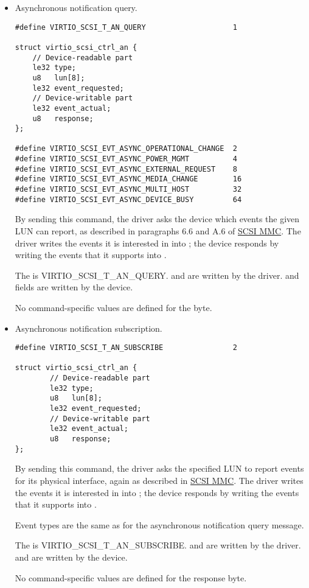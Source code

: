 \begin{itemize}
\item Asynchronous notification query.
\begin{lstlisting}
#define VIRTIO_SCSI_T_AN_QUERY                    1

struct virtio_scsi_ctrl_an {
    // Device-readable part
    le32 type;
    u8   lun[8];
    le32 event_requested;
    // Device-writable part
    le32 event_actual;
    u8   response;
};

#define VIRTIO_SCSI_EVT_ASYNC_OPERATIONAL_CHANGE  2
#define VIRTIO_SCSI_EVT_ASYNC_POWER_MGMT          4
#define VIRTIO_SCSI_EVT_ASYNC_EXTERNAL_REQUEST    8
#define VIRTIO_SCSI_EVT_ASYNC_MEDIA_CHANGE        16
#define VIRTIO_SCSI_EVT_ASYNC_MULTI_HOST          32
#define VIRTIO_SCSI_EVT_ASYNC_DEVICE_BUSY         64
\end{lstlisting}

  By sending this command, the driver asks the device which
  events the given LUN can report, as described in paragraphs 6.6
  and A.6 of \hyperref[intro:SCSI MMC]{SCSI MMC}. The driver writes the
  events it is interested in into ; the device
  responds by writing the events that it supports into
  .

  The  is VIRTIO_SCSI_T_AN_QUERY.  and 
  are written by the driver.  and 
  fields are written by the device.

  No command-specific values are defined for the  byte.

\item Asynchronous notification subscription.
\begin{lstlisting}
#define VIRTIO_SCSI_T_AN_SUBSCRIBE                2

struct virtio_scsi_ctrl_an {
        // Device-readable part
        le32 type;
        u8   lun[8];
        le32 event_requested;
        // Device-writable part
        le32 event_actual;
        u8   response;
};
\end{lstlisting}

  By sending this command, the driver asks the specified LUN to
  report events for its physical interface, again as described in
   \hyperref[intro:SCSI MMC]{SCSI MMC}. The driver writes the events it is
  interested in into ; the device responds by
  writing the events that it supports into .

  Event types are the same as for the asynchronous notification
  query message.

  The  is VIRTIO_SCSI_T_AN_SUBSCRIBE.  and
   are written by the driver.
   and  are written by the device.

  No command-specific values are defined for the response byte.
\end{itemize}

